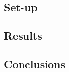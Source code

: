 \documentclass{report}
\begin{document}
\cite{scipy}
\subsection*{Set-up}
\subsection*{Results}
\subsection*{Conclusions}

\nocite{*}


\end{document}
